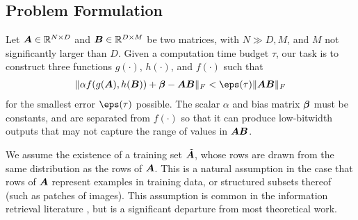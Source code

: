 \subsection{Problem Formulation}

Let $\bm{A} \in \mathbb{R}^{N \times D}$ and $\bm{B} \in \mathbb{R}^{D \times M}$ be two matrices, with $N \gg D, M$, and $M$ not significantly larger than $D$. Given a computation time budget $\tau$, our task is to
construct three functions $g(\cdot)$, $h(\cdot)$, and $f(\cdot)$ such that
\begin{align}
    \norm{\alpha f(g(\A), h(\B)) + \mat{\beta} - \A\B}_F < \eps(\tau) \norm{\A\B}_F
\end{align}
for the smallest error $\eps(\tau)$ possible. The scalar $\alpha$ and bias matrix $\bm{\beta}$ must be constants, and are separated from $f(\cdot)$ so that it can produce low-bitwidth outputs that may not capture the range of values in $\bm{A}\bm{B}$. %


We assume the existence of a training set $\tilde{\bm{A}}$, whose rows are drawn from the same distribution as the rows of $\bm{A}$. This is a natural assumption in the case that rows of $\bm{A}$ represent examples in training data, or structured subsets thereof (such as patches of images). This assumption is common in the information retrieval literature \cite{bolt, pairq}, but is a significant departure from most theoretical work.





